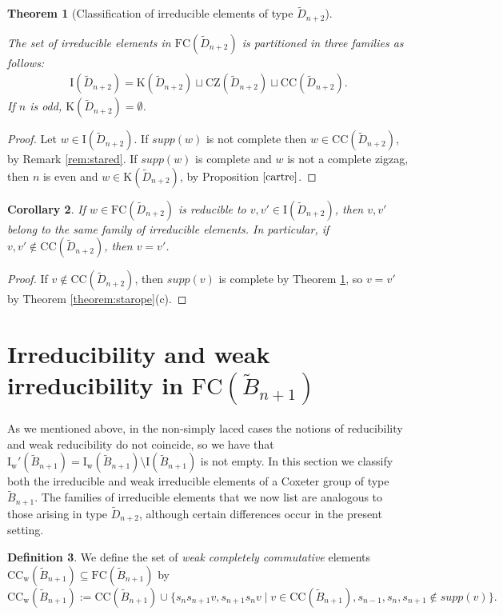 \documentclass{amsart}
\newcommand{\D}{{\widetilde{D}_{n+2}}}
\newcommand{\B}{{\widetilde{B}_{n+1}}}
\newcommand{\fc}{{\mathrm{FC}}}
\newcommand{\TTC}{\mathrm{CC}}
\newcommand{\TTCw}{\mathrm{CC_w}}
\newcommand{\zz}{\mathrm{CZ}}
\newcommand{\car}{\mathrm{K}}
\newcommand{\IR}{\mathrm{I_w}}
\newcommand{\IRc}{\mathrm{I_w'}}
\newcommand{\I}{\mathrm{I}}
\newtheorem{Theorem}{Theorem}[section]
\newtheorem{Corollary}[Theorem]{Corollary}
\theoremstyle{definition}
\newtheorem{Definition}[Theorem]{Definition}
\begin{document}
\begin{Theorem}[Classification of irreducible elements of type $\D$]\ 
\label{decimo}

\noindent
The set of irreducible elements in $\fc(\D)$ is partitioned in three families as follows:
\begin{align*}
    \I(\D) = \car (\D) \sqcup \zz(\D) \sqcup \TTC(\D).
\end{align*}
If $n$ is odd, $\car(\D)=\emptyset$. 
\end{Theorem}

\begin{proof}
Let $w\in \I(\D)$. If $supp(w)$ is not complete then $w\in \TTC(\D)$, by Remark \ref{rem:stared}. If $supp(w)$ is complete and $w$ is not a complete zigzag, then $n$ is even and $w\in \car(\D)$, by Proposition $\ref{cartre}$. 
\end{proof}


\begin{Corollary}
\label{corollary:corclassification}
    If $w\in \fc(\D)$ is reducible to $v,v'\in \I(\D)$, then $v,v'$ belong to the same family of irreducible elements. In particular, if $v,v'\notin \TTC(\D)$, then $v=v'$. 
\end{Corollary}

\begin{proof}
    If $v\notin \TTC(\D)$, then $supp(v)$ is complete by Theorem \ref{decimo}, so $v=v'$ by Theorem \ref{theorem:starope}(c).
\end{proof}


\section{Irreducibility and weak irreducibility in $\fc(\B)$}\label{se3}

As we mentioned above, in the non-simply laced cases the notions of reducibility and weak reducibility do not coincide, so we have that $\IRc(\B)=\IR(\B)\setminus\I(\B)$ is not empty.
In this section we classify both the irreducible and weak irreducible elements of a Coxeter group of type $\B$. The families of irreducible elements that we now list are analogous to those arising in type $\D$, although certain differences occur in the present setting.


\begin{Definition}
\label{pseudocomm}
We define the set of \textit{weak completely commutative} elements $\TTCw(\B)\subseteq \fc(\B)$ by $$\TTCw(\B):=\TTC(\B)\cup\{s_ns_{n+1}v, s_{n+1}s_nv\mid v\in \TTC(\B), s_{n-1},s_n,s_{n+1}\notin supp(v)\}.$$ 

\end{Definition}
\end{document}
